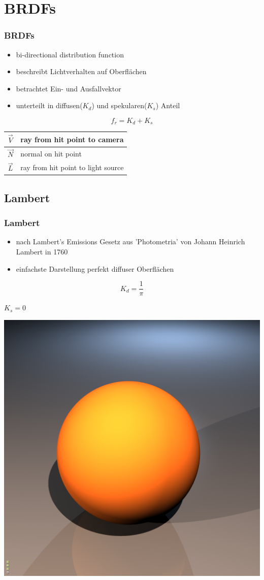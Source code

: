 \documentclass[11pt]{beamer}
\begin{document}
\section{BRDFs}
\begin{frame}
\frametitle{BRDFs}
\begin{itemize}
\item bi-directional distribution function
\item beschreibt Lichtverhalten auf Oberflächen
\item betrachtet Ein- und Ausfallvektor
\item unterteilt in diffusen($K_d$) und spekularen($K_s$) Anteil
\end{itemize}
\parskip 10pt

\begin{equation}
f_r = K_d + K_s
\end{equation}

\begin{table}[H]
\begin{tabular}{| c | l |}
\hline
$\vec{V}$ & ray from hit point to camera\\ \hline
$\vec{N}$ & normal on hit point\\ \hline
$\vec{L}$ & ray from hit point to light source\\ \hline
\end{tabular}
\end{table}

\end{frame}



\subsection{Lambert}
\begin{frame}
\frametitle{Lambert}
\begin{center}
\begin{itemize}
\item nach Lambert's Emissions Gesetz aus 'Photometria' von Johann Heinrich Lambert in 1760
\item einfachste Darstellung perfekt diffuser Oberflächen
\end{itemize}

\begin{equation}
K_d = \frac{1}{\pi}
\end{equation}

$K_s = 0$
\parskip 12pt

\includegraphics[width=0.2\linewidth]{../sopro/phong/phongdiff10}
\end{center}
\end{frame}
\end{document}

